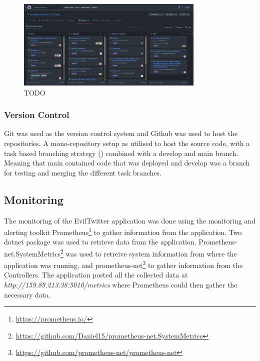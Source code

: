 \documentclass[report/main.tex]{subfiles}
\begin{document}
                \begin{figure}[H]
                    \centering
                    \includegraphics[width=0.8\textwidth]{report/images/Kanban board 1.png}
                    \caption{TODO}
                    \label{fig:kanban-board-1}
                \end{figure}

            \subsubsection{Version Control}
            \label{subsubsec:version-control}
                Git was used as the version control system and Github was used to host the repositories. A mono-repository setup as utilised to host the source code, with a task based branching strategy (\cite{task-branching}) combined with a develop and main branch. Meaning that main contained code that was deployed and develop was a branch for testing and merging the different task branches.
                
        \subsection{Monitoring}
        \label{SubSec:monitoring}
            The monitoring of the EvilTwitter application was done using the monitoring and alerting toolkit Prometheus\footnote{\hyperlink{https://prometheus.io/}{https://prometheus.io/}} to gather information from the application. Two dotnet package was used to retrieve data from the application. Prometheus-net.SystemMetrics\footnote{\hyperlink{https://github.com/Daniel15/prometheus-net.SystemMetrics}{https://github.com/Daniel15/prometheus-net.SystemMetrics}} was used to retreive system information from where the application was running, and prometheus-net\footnote{\hyperlink{https://github.com/prometheus-net/prometheus-net}{https://github.com/prometheus-net/prometheus-net}} to gather information from the Controllers. The application posted all the collected data at \textit{http://159.89.213.38:5010/metrics} where Prometheus could then gather the necessary data.
                
\end{document}
